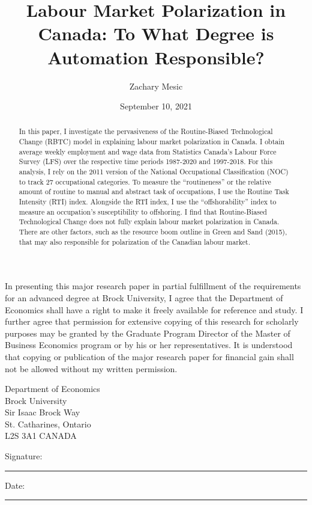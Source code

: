 \documentclass[undefended]{bumrp}
\title{Labour Market Polarization in Canada: To What Degree is Automation Responsible?}
\author{Zachary Mesic}
\date{September 10,  2021}     %
\begin{document}
\frontmatter
\maketitle{}
\makecommittee{}

\begin{Agreement}
In presenting this major research paper in partial fulfillment of the requirements for an advanced degree at Brock University, I agree that the Department of Economics shall have a right to make it freely available for reference and study.  I further agree that permission for extensive copying of this research for scholarly purposes may be granted by the Graduate Program Director of the Master of Business Economics program or by his or her representatives.  It is understood that copying or publication of the major research paper for financial gain shall not be allowed without my written permission.

\vspace{2cm}

\noindent
Department of Economics\\
\noindent Brock University\\
 Sir Isaac Brock Way\\
\noindent St. Catharines, Ontario\\
\noindent L2S 3A1 CANADA

\vspace{2cm}
\noindent Signature:\hspace{0.5cm}\rule{6cm}{0.01cm}\hfill Date:\hspace{0.5cm}\rule{4cm}{0.01cm}

\end{Agreement}

\begin{abstract}
	In this paper, I investigate the pervasiveness of the Routine-Biased Technological Change (RBTC) model in explaining labour market polarization in Canada. I obtain average weekly employment and wage data from Statistics Canada’s Labour Force Survey (LFS) over the respective time periods 1987-2020 and 1997-2018. For this analysis, I rely on the 2011 version of the National Occupational Classification (NOC) to track 27 occupational categories. To measure the “routineness” or the relative amount of routine to manual and abstract task of occupations, I use the Routine Task Intensity (RTI) index. Alongside the RTI index, I use the “offshorability” index to measure an occupation’s susceptibility to offshoring. I find that Routine-Biased Technological Change does not fully explain labour market polarization in Canada. There are other factors, such as the resource boom outline in Green and Sand (2015), that may also responsible for polarization of the Canadian labour market.
\end{abstract}
\end{document}
